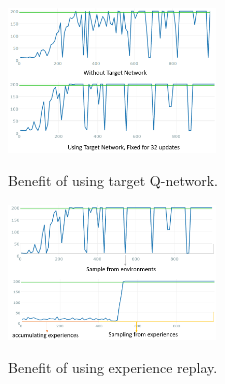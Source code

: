 \begin{figure}[ht!]
	\centering
	\includegraphics[width=0.49\textwidth]{./fig/target_network_result.png} \\
	\caption{Benefit of using target Q-network.}
	\label{fig:target_network_result}
\end{figure}

\begin{figure}[ht!]
	\centering
	\includegraphics[width=0.49\textwidth]{./fig/er_result.png} \\
	\caption{Benefit of using experience replay.}
	\label{fig:er_result}
\end{figure}


